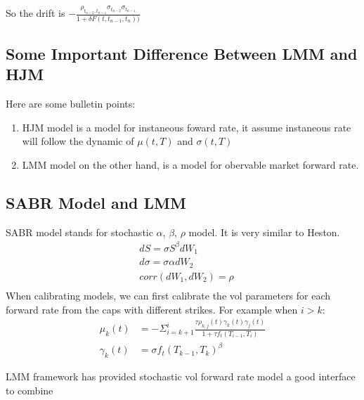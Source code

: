 So the drift is $ -\frac{\rho_{t_{n-2}, t_{n-1}}\sigma_{t_{n-2}}\sigma_{t_{n-1}}}{1 + \delta F(t, t_{n-1}, t_{n}))} $

\subsection{Some Important Difference Between LMM and HJM}
Here are some bulletin points:
\begin{enumerate}
  \item HJM model is a model for instaneous foward rate, it assume instaneous rate will follow the dynamic of $\mu(t, T)$ and $\sigma(t, T)$
  \item LMM model on the other hand, is a model for obervable market forward rate.
\end{enumerate}

\subsection{SABR Model and LMM}
SABR model stands for stochastic $\alpha$, $\beta$, $\rho$ model. It is very similar to Heston.
\begin{equation}
\begin{aligned}
& dS = \sigma S^{\beta} dW_1\\
& d\sigma = \sigma \alpha dW_2\\
& corr(dW_1, dW_2) = \rho\\
\end{aligned}
\end{equation}
When calibrating models, we can first calibrate the vol parameters for each forward rate from the caps with different strikes.
For example when $i > k$:
\begin{equation}
\begin{aligned}
\mu_k(t) &= - \Sigma_{i=k+1}^i\frac{\tau \rho_{k, j}(t) \gamma_k(t) \gamma_j(t)}{1 + \tau f_t(T_{i-1}, T_i)}\\
\gamma_k(t) &= \sigma f_t(T_{k-1}, T_k)^{\beta}
\end{aligned}
\end{equation}

LMM framework has provided stochastic vol forward rate model a good interface to combine
